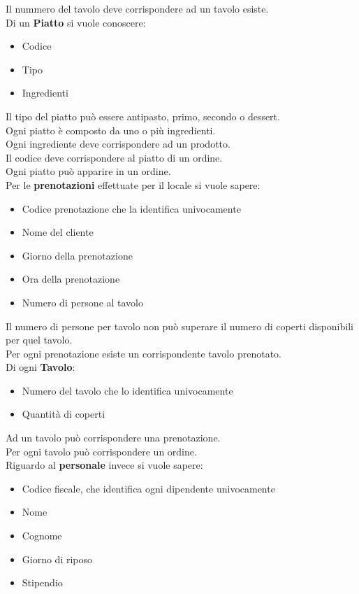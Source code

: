 Il nummero del tavolo deve corrispondere ad un tavolo esiste. \medskip \\
Di un \textbf{Piatto} si vuole conoscere:
\begin{itemize}
    \item Codice
    \item Tipo
    \item Ingredienti
\end{itemize}
Il tipo del piatto può essere antipasto, primo, secondo o dessert.\\
Ogni piatto è composto da uno o più ingredienti. \\
Ogni ingrediente deve corrispondere ad un prodotto. \\
Il codice deve corrispondere al piatto di un ordine. \\ 
Ogni piatto può apparire in un ordine. \medskip \\
Per le \textbf{prenotazioni} effettuate per il locale si vuole sapere:
\begin{itemize}
    \item Codice prenotazione che la identifica univocamente
    \item Nome del cliente
    \item Giorno della prenotazione
    \item Ora della prenotazione
    \item Numero di persone al tavolo
\end{itemize}
Il numero di persone per tavolo non può superare il numero di coperti disponibili per quel tavolo. \\ 
Per ogni prenotazione esiste un corrispondente tavolo prenotato. \medskip \\ 
Di ogni \textbf{Tavolo}:
\begin{itemize}
    \item Numero del tavolo che lo identifica univocamente
    \item Quantità di coperti
\end{itemize}
Ad un tavolo può corrispondere una prenotazione. \\
Per ogni tavolo può corrispondere un ordine. \medskip \\
Riguardo al \textbf{personale} invece si vuole sapere:
\begin{itemize}
    \item Codice fiscale, che identifica ogni dipendente univocamente
    \item Nome 
    \item Cognome 
    \item Giorno di riposo
    \item Stipendio
\end{itemize}
